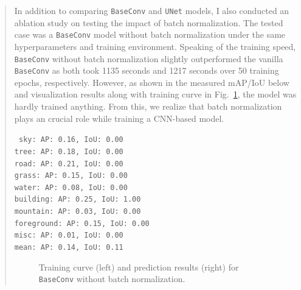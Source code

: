 \documentclass[9pt]{article}
\begin{document}
\begin{quote}
In addition to comparing \texttt{BaseConv} and \texttt{UNet} models, I also conducted an ablation study on testing the impact of batch normalization. The tested case was a \texttt{BaseConv} model without batch normalization under the same hyperparameters and training environment. Speaking of the training speed, \texttt{BaseConv} without batch normalization slightly outperformed the vanilla \texttt{BaseConv} as both took 1135 seconds and 1217 seconds over 50 training epochs, respectively. However, as shown in the measured mAP/IoU below and visualization results along with training curve in Fig.~\ref{fig:ablation-study}, the model was hardly trained anything. From this, we realize that batch normalization plays an crucial role while training a CNN-based model.

{\centering \tt \small
sky: AP: 0.16, IoU: 0.00 \\
tree: AP: 0.18, IoU: 0.00 \\
road: AP: 0.21, IoU: 0.00 \\
grass: AP: 0.15, IoU: 0.00 \\
water: AP: 0.08, IoU: 0.00 \\
building: AP: 0.25, IoU: 1.00 \\
mountain: AP: 0.03, IoU: 0.00 \\
foreground: AP: 0.15, IoU: 0.00 \\
misc: AP: 0.01, IoU: 0.00 \\
mean: AP: 0.14, IoU: 0.11 \\
}

\begin{figure}[h]
    \centering
    \qquad
    \caption{Training curve (left) and prediction results (right) for \texttt{BaseConv} without batch normalization.}
    \label{fig:ablation-study}
\end{figure}




\end{quote}
\end{document}

